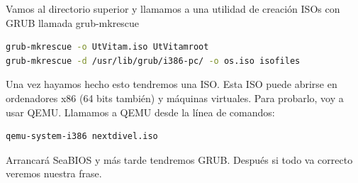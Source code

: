 \documentclass[12pt, twoside]{report}
\begin{document}
Vamos al directorio superior y llamamos a una utilidad de creación ISOs con GRUB llamada grub-mkrescue

\begin{lstlisting}[language=bash]
grub-mkrescue -o UtVitam.iso UtVitamroot
grub-mkrescue -d /usr/lib/grub/i386-pc/ -o os.iso isofiles
\end{lstlisting}


Una vez hayamos hecho esto tendremos una ISO. Esta ISO puede abrirse en ordenadores x86 (64 bits también) y máquinas virtuales. Para probarlo, voy a usar QEMU. Llamamos a QEMU desde la línea de comandos:

\begin{lstlisting}[language=bash]
qemu-system-i386 nextdivel.iso

\end{lstlisting}

Arrancará SeaBIOS y más tarde tendremos GRUB. Después si todo va correcto veremos nuestra frase.




\end{document}
